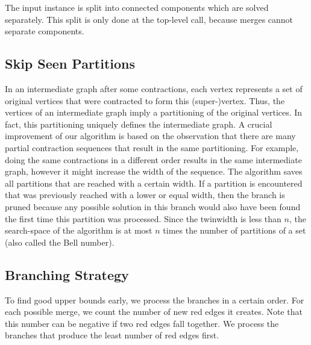 \documentclass[a4paper,UKenglish,cleveref, autoref, thm-restate]{lipics-v2021}
\begin{document}
The input instance is split into connected components which are solved separately.
This split is only done at the top-level call, because merges cannot separate components.


\subsection{Skip Seen Partitions}
In an intermediate graph after some contractions, each vertex represents a set of original vertices that were contracted to form this (super-)vertex.
Thus, the vertices of an intermediate graph imply a partitioning of the original vertices.
In fact, this partitioning uniquely defines the intermediate graph.
A crucial improvement of our algorithm is based on the observation that there are many partial contraction sequences that result in the same partitioning.
For example, doing the same contractions in a different order results in the same intermediate graph, however it might increase the width of the sequence.
The algorithm saves all partitions that are reached with a certain width.
If a partition is encountered that was previously reached with a lower or equal width, then the branch is pruned because any possible solution in this branch would also have been found the first time this partition was processed.
Since the twinwidth is less than $n$, the search-space of the algorithm is at most $n$ times the number of partitions of a set (also called the Bell number).


\subsection{Branching Strategy}
To find good upper bounds early, we process the branches in a certain order.
For each possible merge, we count the number of new red edges it creates.
Note that this number can be negative if two red edges fall together.
We process the branches that produce the least number of red edges first.
\end{document}
